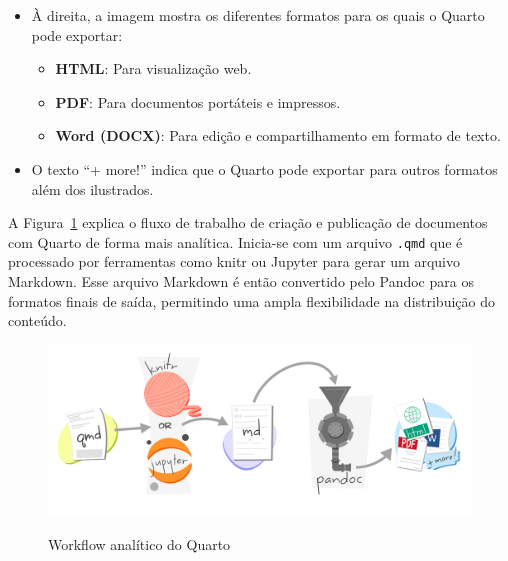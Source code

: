 \documentclass[
  a4paper,
]{book}
\providecommand{\tightlist}{%
  \setlength{\itemsep}{0pt}\setlength{\parskip}{0pt}}\usepackage{longtable,booktabs,array}
\begin{document}
\begin{tcolorbox}
\begin{enumerate}
  \begin{itemize}
  \tightlist
  \item
    À direita, a imagem mostra os diferentes formatos para os quais o
    Quarto pode exportar:

    \begin{itemize}
    \tightlist
    \item
      \textbf{HTML}: Para visualização web.
    \item
      \textbf{PDF}: Para documentos portáteis e impressos.
    \item
      \textbf{Word (DOCX)}: Para edição e compartilhamento em formato de
      texto.
    \end{itemize}
  \item
    O texto ``+ more!'' indica que o Quarto pode exportar para outros
    formatos além dos ilustrados.
  \end{itemize}
\end{enumerate}

\end{tcolorbox}

A Figura~\ref{fig-quarto-process} explica o fluxo de trabalho de criação
e publicação de documentos com Quarto de forma mais analítica. Inicia-se
com um arquivo \texttt{.qmd} que é processado por ferramentas como knitr
ou Jupyter para gerar um arquivo Markdown. Esse arquivo Markdown é então
convertido pelo Pandoc para os formatos finais de saída, permitindo uma
ampla flexibilidade na distribuição do conteúdo.

\begin{figure}

\href{https://r-cubed-advanced.rostools.org/sessions/build-website}{\includegraphics{img/quarto-process.png}}

\caption{\label{fig-quarto-process}Workflow analítico do Quarto}

\end{figure}%
\end{document}
